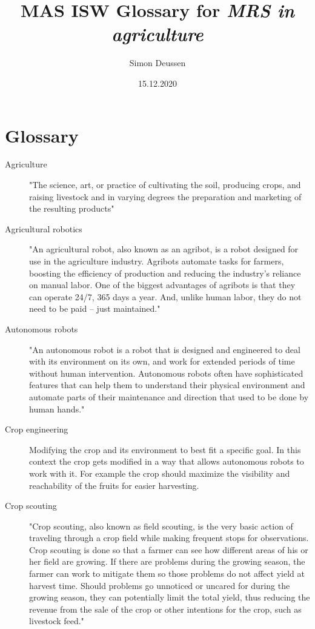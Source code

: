 \documentclass{article}
\title{MAS ISW Glossary for \emph{MRS in agriculture}}
\date{15.12.2020}
\author{Simon Deussen}
\begin{document}
\maketitle
{}

\section{Glossary}

\begin{description}
    \item[Agriculture] "The science, art, or practice of cultivating the soil, producing crops, and raising livestock and in varying degrees the preparation and marketing of the resulting products" \cite{MerriamWebster2020}
    \item[Agricultural robotics] "An agricultural robot, also known as an agribot, is a robot designed for use in the agriculture industry.
    Agribots automate tasks for farmers, boosting the efficiency of production and reducing the industry’s reliance on manual labor. 
    One of the biggest advantages of agribots is that they can operate 24/7, 365 days a year. And, unlike human labor, they do not need to be paid – just maintained." \cite{MarketBusinessNews2020} 
    \item[Autonomous robots] "An autonomous robot is a robot that is designed and engineered to deal with its environment on its own, and work for extended periods of time without human intervention. 
    Autonomous robots often have sophisticated features that can help them to understand their physical environment and automate parts of their maintenance and direction that used to be done by human hands." \cite{Technopedia2020}    
    \item[Crop engineering]  Modifying the crop and its environment to best fit a specific goal. In this context the crop gets modified in a way that allows autonomous robots to work with it. For example the crop should maximize the visibility and reachability of the fruits for easier harvesting.
    \item[Crop scouting]  "Crop scouting, also known as field scouting, is the very basic action of traveling through a crop field while making frequent stops for observations. Crop scouting is done so that a farmer can see how different areas of his or her field are growing. If there are problems during the growing season, the farmer can work to mitigate them so those problems do not affect yield at harvest time. Should problems go unnoticed or uncared for during the growing season, they can potentially limit the total yield, thus reducing the revenue from the sale of the crop or other intentions for the crop, such as livestock feed." \cite{Farms2020}

\end{description}
\end{document}
